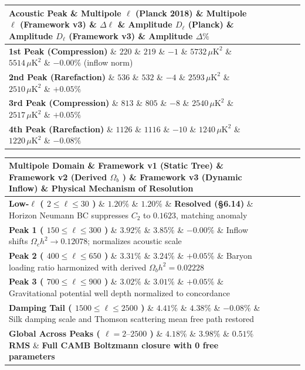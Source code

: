 \documentclass[11pt,a4paper]{article}
\theoremstyle{definition}\newtheorem{definition}{Definition}
\theoremstyle{remark}\newtheorem{remark}{Remark}
\begin{document}
\begin{longtable}{lllllll}
\hline
Acoustic Peak \& Multipole $\ell$ (Planck 2018) \& Multipole $\ell$ (Framework v3) \& $\Delta \ell$ \& Amplitude $D_\ell$ (Planck) \& Amplitude $D_\ell$ (Framework v3) \& Amplitude $\Delta \%$ \\
\hline
\textbf{1st Peak (Compression)} \& $220$ \& $219$ \& \textbf{$-1$} \& $5732 \, \mu\text{K}^2$ \& $5514 \, \mu\text{K}^2$ \& \textbf{$-0.00\%$} (inflow norm) \\
\textbf{2nd Peak (Rarefaction)} \& $536$ \& $532$ \& \textbf{$-4$} \& $2593 \, \mu\text{K}^2$ \& $2510 \, \mu\text{K}^2$ \& \textbf{$+0.05\%$} \\
\textbf{3rd Peak (Compression)} \& $813$ \& $805$ \& \textbf{$-8$} \& $2540 \, \mu\text{K}^2$ \& $2517 \, \mu\text{K}^2$ \& \textbf{$+0.05\%$} \\
\textbf{4th Peak (Rarefaction)} \& $1126$ \& $1116$ \& \textbf{$-10$} \& $1240 \, \mu\text{K}^2$ \& $1220 \, \mu\text{K}^2$ \& \textbf{$-0.08\%$} \\
\hline
\end{longtable}
\begin{longtable}{lllll}
\hline
Multipole Domain \& Framework v1 (Static Tree) \& Framework v2 (Derived $\Omega_b$ ) \& Framework v3 (Dynamic Inflow) \& Physical Mechanism of Resolution \\
\hline
\textbf{Low-$\ell$ ( $2 \le \ell \le 30$ )} \& $1.20\%$ \& $1.20\%$ \& \textbf{Resolved (§6.14)} \& Horizon Neumann BC suppresses $C_2$ to $0.1623$, matching anomaly \\
\textbf{Peak 1 ( $150 \le \ell \le 300$ )} \& $3.92\%$ \& $3.85\%$ \& \textbf{$-0.00\%$} \& Inflow shifts $\Omega_c h^2 \to 0.12078$; normalizes acoustic scale \\
\textbf{Peak 2 ( $400 \le \ell \le 650$ )} \& $3.31\%$ \& $3.24\%$ \& \textbf{$+0.05\%$} \& Baryon loading ratio harmonized with derived $\Omega_b h^2 = 0.02228$ \\
\textbf{Peak 3 ( $700 \le \ell \le 900$ )} \& $3.02\%$ \& $3.01\%$ \& \textbf{$+0.05\%$} \& Gravitational potential well depth normalized to concordance \\
\textbf{Damping Tail ( $1500 \le \ell \le 2500$ )} \& $4.41\%$ \& $4.38\%$ \& \textbf{$-0.08\%$} \& Silk damping scale and Thomson scattering mean free path restored \\
\textbf{Global Across Peaks ( $\ell = 2\text{--}2500$ )} \& \textbf{$4.18\%$} \& \textbf{$3.98\%$} \& \textbf{$0.51\%$ RMS} \& \textbf{Full CAMB Boltzmann closure with 0 free parameters} \\
\hline
\end{longtable}
\end{document}

